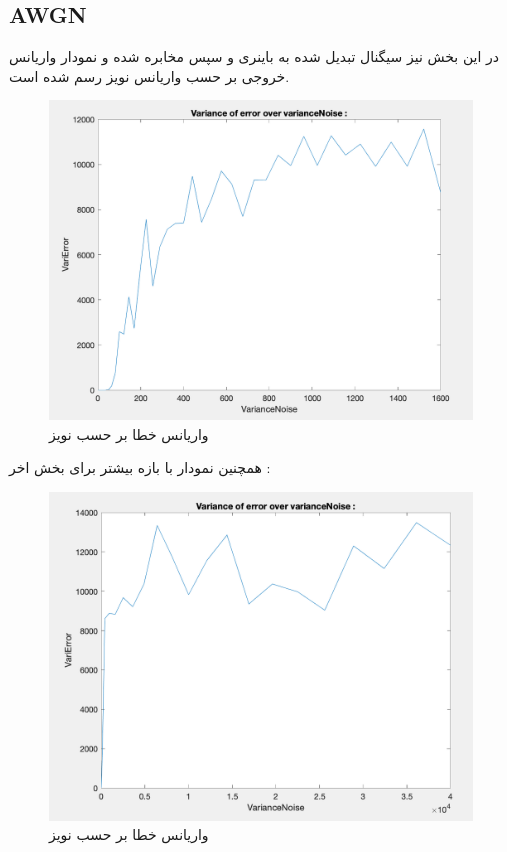 \documentclass[10pt]{article}
\begin{document}
	\subsection{AWGN}
	در این بخش نیز سیگنال تبدیل شده به باینری و سپس مخابره شده و نمودار واریانس خروجی بر حسب واریانس نویز رسم شده است.
	\begin{figure}[H]
		\centering
		\includegraphics[width=0.8\linewidth]{../img/4.2.1}
		\caption{واریانس خطا بر حسب نویز}
		\label{fig:4-2-1}
	\end{figure}
	
	\newpage
	همچنین نمودار با بازه بیشتر برای بخش اخر :
	\begin{figure}[H]
		\centering
		\includegraphics[width=0.8\linewidth]{../img/4.2.2}
		\caption{واریانس خطا بر حسب نویز}
		\label{fig:4-2-2}
	\end{figure}

	\newpage
\end{document}
